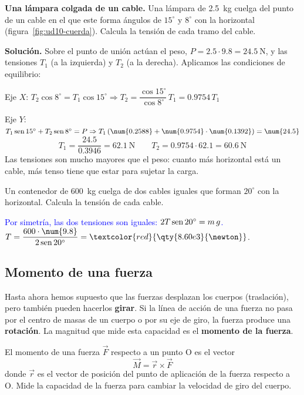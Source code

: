 \begin{example}
    \textbf{Una lámpara colgada de un cable.} Una lámpara de \qty{2.5}{\kg} cuelga del punto de un cable en el que este forma
    ángulos de \(15^\circ\) y \(8^\circ\) con la horizontal (figura~\ref{fig:ud10-cuerda}). Calcula la tensión de cada tramo del cable.

    \textbf{Solución.} Sobre el punto de unión actúan el peso, \(P = \num{2.5} \cdot \num{9.8} = \qty{24.5}{\newton}\), y las tensiones
    \(T_1\) (a la izquierda) y \(T_2\) (a la derecha). Aplicamos las condiciones de equilibrio:

    Eje \(X\): \(T_2\cos 8^\circ = T_1\cos 15^\circ \Rightarrow T_2 = \dfrac{\cos 15^\circ}{\cos 8^\circ}\,T_1 = \num{0.9754}\,T_1\)

    Eje \(Y\): \(T_1\sen 15^\circ + T_2\sen 8^\circ = P \Rightarrow T_1\,(\num{0.2588} + \num{0.9754} \cdot \num{0.1392}) = \num{24.5}\)
    \[ T_1 = \frac{\num{24.5}}{\num{0.3946}} = \qty{62.1}{\newton} \qquad T_2 = \num{0.9754} \cdot \num{62.1} = \qty{60.6}{\newton} \]
    Las tensiones son mucho mayores que el peso: cuanto más horizontal está un cable, más tenso tiene que estar para sujetar la carga.
\end{example}

\begin{exercise}
    Un contenedor de \qty{600}{\kg} cuelga de dos cables iguales que forman \(20^\circ\) con la horizontal. Calcula la tensión de
    cada cable.
    \begin{solu}
        \textcolor{blue}{Por simetría, las dos tensiones son iguales: \(2T\operatorname{sen} 20^\circ = m\,g\).}
        \(T = \dfrac{600 \cdot \num{9.8}}{2\sen 20^\circ} = \textcolor{red}{\qty{8.60e3}{\newton}}\).
    \end{solu}
\end{exercise}

\subsection{Momento de una fuerza}

Hasta ahora hemos supuesto que las fuerzas desplazan los cuerpos (traslación), pero también pueden hacerlos \textbf{girar}. Si la
línea de acción de una fuerza no pasa por el centro de masas de un cuerpo o por su eje de giro, la fuerza produce una
\textbf{rotación}. La magnitud que mide esta capacidad es el \textbf{momento de la fuerza}.

\begin{definition}
    El momento de una fuerza \(\vec{F}\) respecto a un punto O es el vector
    \[ \vec{M} = \vec{r} \times \vec{F} \]
    donde \(\vec{r}\) es el vector de posición del punto de aplicación de la fuerza respecto a O. Mide la capacidad de la fuerza para
    cambiar la velocidad de giro del cuerpo.
\end{definition}

